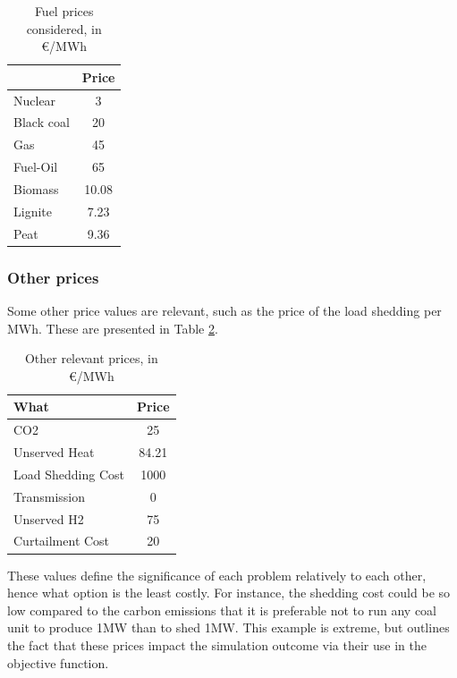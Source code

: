 \begin{table}[h]
    \centering
	\begin{tabular}{|l c|}
		\hline
		& Price \\
		\hline
		Nuclear    & 3 \\
		Black coal & 20 \\
		Gas        & 45 \\
		Fuel-Oil   & 65\\
		Biomass    & 10.08\\
		Lignite    & 7.23\\
		Peat       & 9.36 \\
		\hline
	\end{tabular}
	\caption{Fuel prices considered, in €/MWh}
	\label{table:fuel-prices}
\end{table}

\subsubsection{Other prices}

Some other price values are relevant, such as the price of the load shedding per MWh. These are presented in Table \ref{table:other-prices}.

\begin{table}[h]
    \centering
	\begin{tabular}{|l c|}
		\hline
		What & Price \\
		\hline
		CO2                & 25 \\
		Unserved Heat      & 84.21\\
		Load Shedding Cost & 1000\\
		Transmission       & 0\\
		Unserved H2        & 75\\
		Curtailment Cost   & 20 \\
		\hline
	\end{tabular}
	\caption{Other relevant prices, in €/MWh}
	\label{table:other-prices}
\end{table}


These values define the significance of each problem relatively to each other, hence what option is the least costly. For instance, the shedding cost could be so low compared to the carbon emissions that it is preferable not to run any coal unit to produce 1MW than to shed 1MW. This example is extreme, but outlines the fact that these prices impact the simulation outcome via their use in the objective function.

